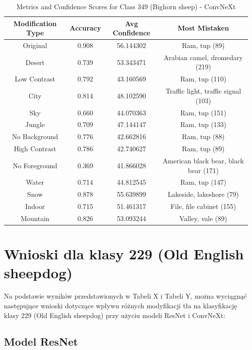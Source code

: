 \begin{table}
	\centering
	\begin{tabular}{|c|c|c|c|}
		\hline
		\textbf{Modification Type} & \textbf{Accuracy} & \textbf{Avg Confidence} & \textbf{Most Mistaken} \\
		\hline
		Original & 0.908 & 56.144302 & Ram, tup (89) \\
		\hline
		Desert & 0.739 & 53.343471 & Arabian camel, dromedary (219) \\
		\hline
		Low Contrast & 0.792 & 43.160569 & Ram, tup (110) \\
		\hline
		City & 0.814 & 48.102590 & Traffic light, traffic signal (103) \\
		\hline
		Sky & 0.660 & 44.070363 & Ram, tup (151) \\
		\hline
		Jungle & 0.709 & 47.144147 & Ram, tup (133) \\
		\hline
		No Background & 0.776 & 42.662816 & Ram, tup (88) \\
		\hline
		High Contrast & 0.786 & 42.740627 & Ram, tup (89) \\
		\hline
		No Foreground & 0.369 & 41.866028 & American black bear, black bear (171) \\
		\hline
		Water & 0.714 & 44.812545 & Ram, tup (147) \\
		\hline
		Snow & 0.878 & 55.639899 & Lakeside, lakeshore (79) \\
		\hline
		Indoor & 0.715 & 51.461317 & File, file cabinet (155) \\
		\hline
		Mountain & 0.826 & 53.093244 & Valley, vale (89) \\
		\hline
	\end{tabular}
	\caption{Metrics and Confidence Scores for Class 349 (Bighorn sheep) - ConvNeXt}
	\label{tab:metrics_confidence_class_349_convnext}
\end{table}

\section*{Wnioski dla klasy 229 (Old English sheepdog)}

Na podstawie wyników przedstawionych w Tabeli X i Tabeli Y, można wyciągnąć następujące wnioski dotyczące wpływu różnych modyfikacji tła na klasyfikację klasy 229 (Old English sheepdog) przy użyciu modeli ResNet i ConvNeXt:

\subsection*{Model ResNet}

